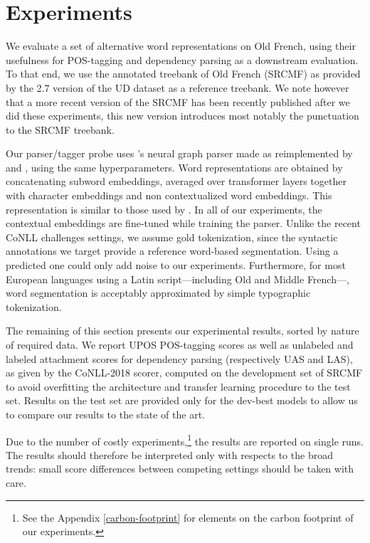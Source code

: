 \section{Experiments}
\label{sec-experiments}
We evaluate a set of alternative word representations on Old French, using their usefulness for POS-tagging and dependency parsing as a downstream evaluation. To that end, we use the annotated treebank of Old French (SRCMF)  \citep{prevost-stein-2013-syntactic} as provided by the 2.7 version of the UD dataset \citep{zeman-etal-2020-universal} as a reference treebank. We note however that a more recent version of the SRCMF has been recently published \citep{zeman-etal-2021-universal} after we did these experiments, this new version introduces most notably the punctuation to the SRCMF treebank.

Our parser/tagger probe uses \citet{dozat-manning-2018-simpler}'s neural graph parser made as reimplemented by \citet{le-etal-2020-flaubert} and \citet{grobol-crabbe-2021-analyse}, using the same hyperparameters. Word representations are obtained by concatenating subword embeddings, averaged over transformer layers together with character embeddings and non contextualized word embeddings. This representation is similar to those used by \citet{straka-strakova-2019-evaluating,ling-etal-2015-finding}. In all of our experiments, the contextual embeddings are fine-tuned while training the parser. Unlike the recent CoNLL challenges settings, we assume gold tokenization, since the syntactic annotations we target provide a reference word-based segmentation. Using a predicted one could only add noise to our experiments. Furthermore, for most European languages using a Latin script---including Old and Middle French---, word segmentation is acceptably approximated by simple typographic tokenization.

The remaining of this section presents our experimental results, sorted by nature of required data. We report UPOS POS-tagging scores as well as unlabeled and labeled attachment scores for dependency parsing (respectively UAS and LAS), as given by the CoNLL-2018 scorer, computed on the development set of SRCMF to avoid overfitting the architecture and transfer learning procedure to the test set. Results on the test set are provided only for the dev-best models to allow us to compare our results to the state of the art.

Due to the number of costly experiments,\footnote{See the Appendix \ref{carbon-footprint} for elements on the carbon footprint of our experiments.} the results are reported on single runs. The results should therefore be interpreted only with respects to the broad trends: small score differences between competing settings should be taken with care.

